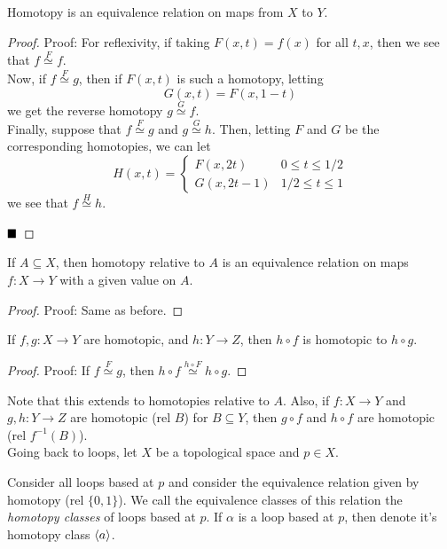 \begin{lemma}
    Homotopy is an equivalence relation on maps from $X$ to $Y$. 
\end{lemma}
\begin{proof}{Proof:}
    For reflexivity, if taking $F(x, t) = f(x)$ for all $t, x$, then we see that $f \overset{F}{\simeq} f$.\\

    Now, if $f \overset{F}{\simeq} g$, then if $F(x, t)$ is such a homotopy, letting
    \[ G(x, t) = F(x, 1 - t) \]
    we get the reverse homotopy $g \overset{G}{\simeq} f$.\\

    Finally, suppose that $f \overset{F}{\simeq} g$ and $g \overset{G}{\simeq} h$. Then, letting $F$ and $G$ be the corresponding homotopies, we can let
    \[ H(x, t) = \left\{\begin{matrix} F(x, 2t) & 0 \leq t \leq 1/2 \\ G(x, 2t - 1) & 1/2 \leq t \leq 1 \end{matrix}\right. \]
    we see that $f \overset{H}{\simeq} h$. 

    $\qed$
\end{proof}

\begin{lemma}
    If $A \subseteq X$, then homotopy relative to $A$ is an equivalence relation on maps $f : X \to Y$ with a given value on $A$. 
\end{lemma}
\begin{proof}{Proof:}
    Same as before. 
\end{proof}

\begin{lemma}
    If $f, g : X \to Y$ are homotopic, and $h : Y \to Z$, then $h \circ f$ is homotopic to $h \circ g$. 
\end{lemma}
\begin{proof}{Proof:}
    If $f \overset{F}{\simeq} g$, then $h \circ f \overset{h \circ F}{\simeq} h \circ g$. 
\end{proof}
Note that this extends to homotopies relative to $A$. Also, if $f : X \to Y$ and $g, h : Y \to Z$ are homotopic (rel $B$) for $B \subseteq Y$, then $g \circ f$ and $h \circ f$ are homotopic (rel $f^{-1}(B)$).\\

Going back to loops, let $X$ be a topological space and $p \in X$. 

\begin{definition}
    Consider all loops based at $p$ and consider the equivalence relation given by homotopy (rel $\{0, 1\}$). We call the equivalence classes of this relation the \emph{homotopy classes} of loops based at $p$. If $\alpha$ is a loop based at $p$, then denote it's homotopy class $\left\langle {a} \right\rangle$. 
\end{definition}

